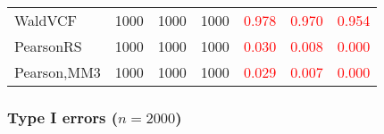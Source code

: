 \documentclass[
]{article}
\begin{document}
\begin{table}[H]
{\begin{tabular}[t]{lrrrrrr}
\hspace{1em}WaldVCF & 1000 & 1000 & 1000 & \textcolor{red}{0.978} & \textcolor{red}{0.970} & \textcolor{red}{0.954}\\
\hspace{1em}PearsonRS & 1000 & 1000 & 1000 & \textcolor{red}{0.030} & \textcolor{red}{0.008} & \textcolor{red}{0.000}\\
\hspace{1em}Pearson,MM3 & 1000 & 1000 & 1000 & \textcolor{red}{0.029} & \textcolor{red}{0.007} & \textcolor{red}{0.000}\\
\bottomrule
\end{tabular}}
\endgroup{}
\end{table}

\hypertarget{type-i-errors-n2000-3}{%
\subsubsection{\texorpdfstring{Type I errors
(\(n=2000\))}{Type I errors (n=2000)}}\label{type-i-errors-n2000-3}}
\end{document}
